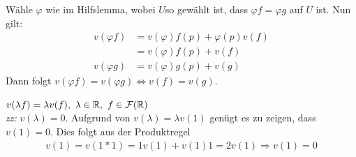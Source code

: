 \begin{bew}[zu 2]
Wähle $\varphi$ wie im Hilfslemma, wobei $U$so gewählt ist, dass $\varphi f = \varphi g$ auf $U$ ist. Nun gilt:
\begin{align*}
v(\varphi f) &= v(\varphi)f(p) + \varphi(p)v(f)\\
&= v(\varphi)f(p) + v(f)\\
v(\varphi g) &= v(\varphi)g(p) + v(g)
\end{align*}
Dann folgt $v(\varphi f) = v(\varphi g) \Leftrightarrow v(f) = v(g)$.
\end{bew}

\begin{bew}[zu 1]
	$v(\lambda f) = \lambda v(f),\ \lambda \in \mathbb{R},\ f\in \mathcal{F}(\mathbb{R})$\\
	\textit{zz:} $v(\lambda) = 0$. 
	Aufgrund von $v(\lambda) = \lambda v(1)$ genügt es zu zeigen, dass $v(1) = 0$. Dies folgt aus der Produktregel
	\begin{align*}
	v(1) = v(1*1) = 1v(1) + v(1)1 = 2v(1) \Rightarrow v(1) = 0
	\end{align*}
\end{bew}

